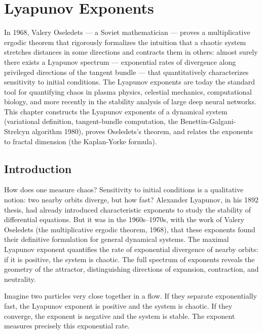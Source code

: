 \chapter{Lyapunov Exponents}
\label{ch:exponents}

In 1968, Valery Oseledets --- a Soviet mathematician --- proves a multiplicative ergodic theorem that rigorously formalizes the intuition that a chaotic system stretches distances in some directions and contracts them in others: almost surely there exists a Lyapunov spectrum --- exponential rates of divergence along privileged directions of the tangent bundle --- that quantitatively characterizes sensitivity to initial conditions. The Lyapunov exponents are today the standard tool for quantifying chaos in plasma physics, celestial mechanics, computational biology, and more recently in the stability analysis of large deep neural networks. This chapter constructs the Lyapunov exponents of a dynamical system (variational definition, tangent-bundle computation, the Benettin-Galgani-Strelcyn algorithm 1980), proves Oseledets's theorem, and relates the exponents to fractal dimension (the Kaplan-Yorke formula).

\section{Introduction}

How does one measure chaos? Sensitivity to initial conditions is a qualitative notion: two nearby orbits diverge, but how fast? Alexander Lyapunov, in his 1892 thesis, had already introduced characteristic exponents to study the stability of differential equations. But it was in the 1960s--1970s, with the work of Valery Oseledets (the multiplicative ergodic theorem, 1968), that these exponents found their definitive formulation for general dynamical systems. The maximal Lyapunov exponent quantifies the rate of exponential divergence of nearby orbits: if it is positive, the system is chaotic. The full spectrum of exponents reveals the geometry of the attractor, distinguishing directions of expansion, contraction, and neutrality.

\begin{intuition}
Imagine two particles very close together in a flow. If they separate
exponentially fast, the Lyapunov exponent is positive and the system is
chaotic. If they converge, the exponent is negative and the system is stable.
The exponent measures precisely this exponential rate.
\end{intuition}

